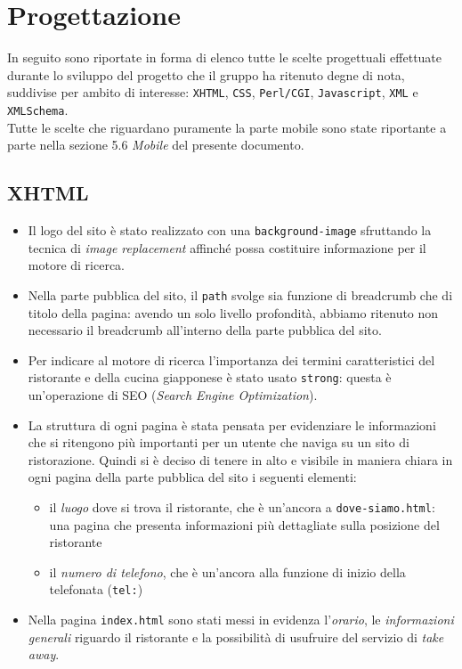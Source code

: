 \documentclass[../relazione.tex]{subfiles}
\begin{document}
\section{Progettazione}
	In seguito sono riportate in forma di elenco tutte le scelte progettuali effettuate durante lo sviluppo del progetto che il gruppo ha ritenuto degne di nota, suddivise per ambito di interesse: \texttt{XHTML}, \texttt{CSS}, \texttt{Perl/CGI}, \texttt{Javascript}, \texttt{XML} e \texttt{XMLSchema}.\\
	Tutte le scelte che riguardano puramente la parte mobile sono state riportante a parte nella sezione 5.6 \textit{Mobile} del presente documento.
	\subsection{XHTML}
	\begin{itemize}
		\item Il logo del sito è stato realizzato con una \texttt{background-image} sfruttando la tecnica di \textit{image replacement} affinché possa costituire informazione per il motore di ricerca.
		\item Nella parte pubblica del sito, il \texttt{path} svolge sia funzione di breadcrumb che di titolo della pagina: avendo un solo livello profondità, abbiamo ritenuto non necessario il breadcrumb all'interno della parte pubblica del sito.
		\item Per indicare al motore di ricerca l'importanza dei termini caratteristici del ristorante e della cucina giapponese è stato usato \texttt{strong}: questa è un'operazione di SEO (\textit{Search Engine Optimization}).
		\item La struttura di ogni pagina è stata pensata per evidenziare le informazioni che si ritengono più importanti per un utente che naviga su un sito di ristorazione. Quindi si è deciso di tenere in alto e visibile in maniera chiara in ogni pagina della parte pubblica del sito i seguenti elementi:
		\begin{itemize}
			\item il \textit{luogo} dove si trova il ristorante, che è un'ancora a \texttt{dove-siamo.html}: una pagina che presenta informazioni più dettagliate sulla posizione del ristorante
			\item il \textit{numero di telefono}, che è un'ancora alla funzione di inizio della telefonata (\texttt{tel:})
		\end{itemize}
		\item Nella pagina \texttt{index.html} sono stati messi in evidenza l'\textit{orario}, le \textit{informazioni generali} riguardo il ristorante e la possibilità di usufruire del servizio di \textit{take away}.

\end{itemize}
\end{document}
